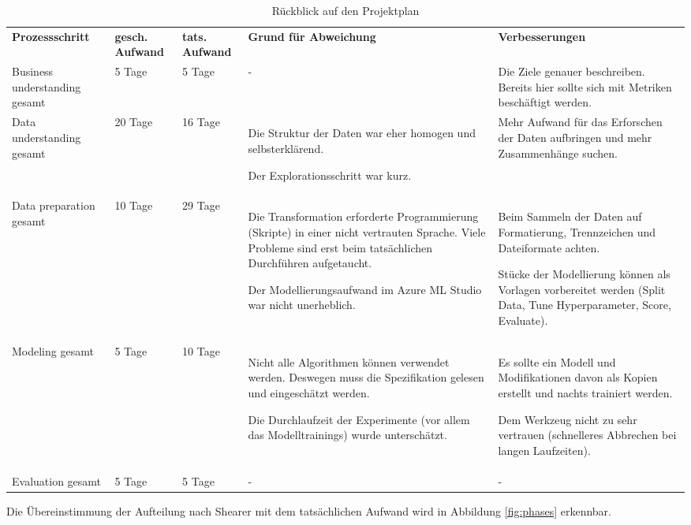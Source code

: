\begin{table}[H]
\centering
\begin{tabular}{|p{3cm}|p{}|p{}|p{}|p{}|}
\hline
\textbf{Prozessschritt} & \textbf{gesch. Aufwand} & \textbf{tats. Aufwand} & \textbf{Grund für Abweichung} & \textbf{Verbesserungen} \\ 
\hhline{=====}
Business understanding gesamt & 5 Tage & 5 Tage & - & Die Ziele genauer beschreiben. Bereits hier sollte sich mit Metriken beschäftigt werden. \\ \hline
Data understanding gesamt & 20 Tage & 16 Tage & Die Struktur der Daten war eher homogen und selbsterklärend.\par Der Explorationsschritt war kurz. & Mehr Aufwand für das Erforschen der Daten aufbringen und mehr Zusammenhänge suchen. \\ \hline
Data preparation gesamt & 10 Tage & 29 Tage & Die Transformation erforderte Programmierung (Skripte) in einer nicht vertrauten Sprache. Viele Probleme sind erst beim tatsächlichen Durchführen aufgetaucht.\par Der Modellierungsaufwand im Azure ML Studio war nicht unerheblich. & Beim Sammeln der Daten auf Formatierung, Trennzeichen und Dateiformate achten.\par Stücke der Modellierung können als Vorlagen vorbereitet werden (Split Data, Tune Hyperparameter, Score, Evaluate). \\ \hline
Modeling gesamt & 5 Tage & 10 Tage & Nicht alle Algorithmen können verwendet werden. Deswegen muss die Spezifikation gelesen und eingeschätzt werden.\par Die Durchlaufzeit der Experimente (vor allem das Modelltrainings) wurde unterschätzt. & Es sollte ein Modell und Modifikationen davon als Kopien erstellt und nachts trainiert werden.\par Dem Werkzeug nicht zu sehr vertrauen (schnelleres Abbrechen bei langen Laufzeiten). \\ \hline
Evaluation gesamt & 5 Tage & 5 Tage & - & - \\ \hline
\end{tabular}
\caption{Rückblick auf den Projektplan}
\label{tab:ProcessReview}
\end{table}

Die Übereinstimmung der Aufteilung nach Shearer mit dem tatsächlichen Aufwand wird in Abbildung \ref{fig:phases} erkennbar.
 
